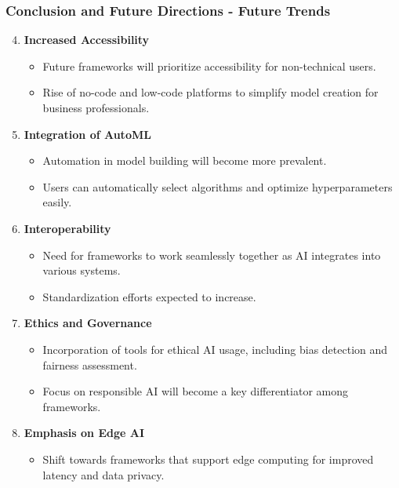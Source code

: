 \documentclass{beamer}
\begin{document}
\begin{frame}[fragile]
    \frametitle{Conclusion and Future Directions - Future Trends}
    \begin{enumerate}
        \setcounter{enumi}{3}
        \item \textbf{Increased Accessibility}
            \begin{itemize}
                \item Future frameworks will prioritize accessibility for non-technical users.
                \item Rise of no-code and low-code platforms to simplify model creation for business professionals.
            \end{itemize}
        \item \textbf{Integration of AutoML}
            \begin{itemize}
                \item Automation in model building will become more prevalent.
                \item Users can automatically select algorithms and optimize hyperparameters easily.
            \end{itemize}
        \item \textbf{Interoperability}
            \begin{itemize}
                \item Need for frameworks to work seamlessly together as AI integrates into various systems.
                \item Standardization efforts expected to increase.
            \end{itemize}
        \item \textbf{Ethics and Governance}
            \begin{itemize}
                \item Incorporation of tools for ethical AI usage, including bias detection and fairness assessment.
                \item Focus on responsible AI will become a key differentiator among frameworks.
            \end{itemize}
        \item \textbf{Emphasis on Edge AI}
            \begin{itemize}
                \item Shift towards frameworks that support edge computing for improved latency and data privacy.
            \end{itemize}
    \end{enumerate}
\end{frame}
\end{document}

